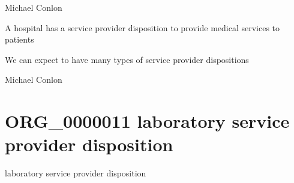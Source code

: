 \documentclass[letterpaper,10pt,english]{sphinxmanual}
\begin{document}
\begin{sphinxShadowBox}

\sphinxAtStartPar
Michael Conlon 
\end{sphinxShadowBox}

\begin{sphinxShadowBox}

\sphinxAtStartPar
A hospital has a service provider disposition to provide medical services to patients
\end{sphinxShadowBox}

\begin{sphinxShadowBox}

\sphinxAtStartPar
We can expect to have many types of service provider dispositions
\end{sphinxShadowBox}

\begin{sphinxShadowBox}

\sphinxAtStartPar
Michael Conlon 
\end{sphinxShadowBox}
\begin{quote}
\label{\detokenize{doc-ORG_0000011:org-0000011}}\label{\detokenize{doc-ORG_0000011:laboratory-service-provider-disposition}}\label{\detokenize{doc-ORG_0000011:org-0000011}}
\ignorespaces \end{quote}


\section{ORG\_0000011 \sphinxhyphen{} laboratory service provider disposition}
\label{\detokenize{doc-ORG_0000011:org-0000011-laboratory-service-provider-disposition}}\label{\detokenize{doc-ORG_0000011:index-0}}\label{\detokenize{doc-ORG_0000011::doc}}
\begin{sphinxShadowBox}

\sphinxAtStartPar
laboratory service provider disposition
\end{sphinxShadowBox}
\end{document}
